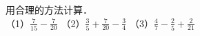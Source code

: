 
用合理的方法计算．\\
（1）$\frac{7}{15}-\frac{7}{20}$\hspace{8em}
（2）$\frac{3}{5}+\frac{7}{20}-\frac{3}{4}$\hspace{8em}
（3）$\frac{4}{7}-\frac{2}{5}+\frac{2}{21}$\hspace{8em}
\\[6em]
